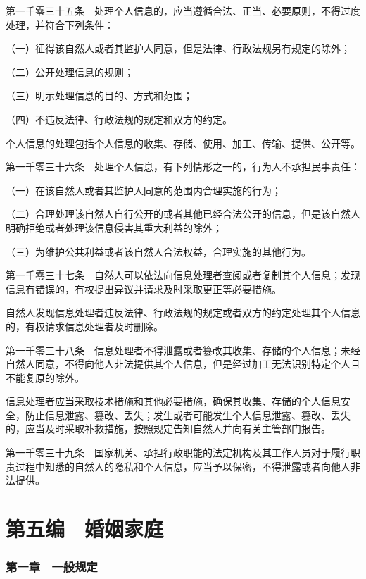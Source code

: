 \documentclass[UTF8,12pt,a4paper]{ctexbook}
\begin{document}
第一千零三十五条　处理个人信息的，应当遵循合法、正当、必要原则，不得过度处理，并符合下列条件：

（一）征得该自然人或者其监护人同意，但是法律、行政法规另有规定的除外；

（二）公开处理信息的规则；

（三）明示处理信息的目的、方式和范围；

（四）不违反法律、行政法规的规定和双方的约定。

个人信息的处理包括个人信息的收集、存储、使用、加工、传输、提供、公开等。

第一千零三十六条　处理个人信息，有下列情形之一的，行为人不承担民事责任：

（一）在该自然人或者其监护人同意的范围内合理实施的行为；

（二）合理处理该自然人自行公开的或者其他已经合法公开的信息，但是该自然人明确拒绝或者处理该信息侵害其重大利益的除外；

（三）为维护公共利益或者该自然人合法权益，合理实施的其他行为。

第一千零三十七条　自然人可以依法向信息处理者查阅或者复制其个人信息；发现信息有错误的，有权提出异议并请求及时采取更正等必要措施。

自然人发现信息处理者违反法律、行政法规的规定或者双方的约定处理其个人信息的，有权请求信息处理者及时删除。

第一千零三十八条　信息处理者不得泄露或者篡改其收集、存储的个人信息；未经自然人同意，不得向他人非法提供其个人信息，但是经过加工无法识别特定个人且不能复原的除外。

信息处理者应当采取技术措施和其他必要措施，确保其收集、存储的个人信息安全，防止信息泄露、篡改、丢失；发生或者可能发生个人信息泄露、篡改、丢失的，应当及时采取补救措施，按照规定告知自然人并向有关主管部门报告。

第一千零三十九条　国家机关、承担行政职能的法定机构及其工作人员对于履行职责过程中知悉的自然人的隐私和个人信息，应当予以保密，不得泄露或者向他人非法提供。

\cleardoublepage
{}
\part*{第五编　婚姻家庭}

\section*{第一章　一般规定}
\end{document}
